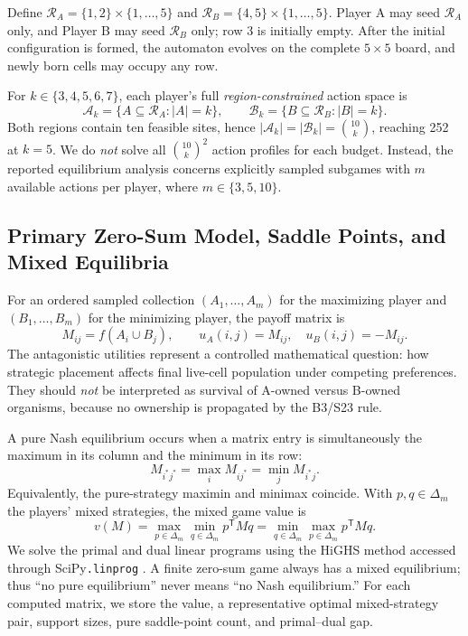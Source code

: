 \documentclass[games,article,submit,moreauthors]{Definitions/mdpi}
\begin{document}
Define $\mathcal{R}_A=\{1,2\}\times\{1,\ldots,5\}$ and $\mathcal{R}_B=\{4,5\}\times\{1,\ldots,5\}$. Player A may seed $\mathcal{R}_A$ only, and Player B may seed  $\mathcal{R}_B$ only; row 3 is initially empty. After the initial configuration is formed, the automaton evolves on the complete $5\times5$ board, and newly born cells may occupy any row.

For $k\in\{3,4,5,6,7\}$, each player's full \emph{region-constrained} action space is
\begin{equation}
\mathcal{A}_k=\{A\subseteq\mathcal{R}_A:|A|=k\},\qquad
\mathcal{B}_k=\{B\subseteq\mathcal{R}_B:|B|=k\}.
\end{equation}
Both regions contain ten feasible sites, hence $|\mathcal{A}_k|=|\mathcal{B}_k|=\binom{10}{k}$, reaching 252 at $k=5$. We do \emph{not} solve all $\binom{10}{k}^2$ action profiles for each budget. Instead, the reported equilibrium analysis concerns explicitly sampled subgames with $m$ available actions per player, where $m\in\{3,5,10\}$.

\subsection{Primary Zero-Sum Model, Saddle Points, and Mixed Equilibria}

For an ordered sampled collection $(A_1,\ldots,A_m)$ for the maximizing player and $(B_1,\ldots,B_m)$ for the minimizing player, the payoff matrix is
\begin{equation}\label{eq:matrix}
M_{ij}=f(A_i\cup B_j),\qquad u_A(i,j)=M_{ij},\quad u_B(i,j)=-M_{ij}.
\end{equation}
The antagonistic utilities represent a controlled mathematical question: how strategic placement affects final live-cell population under competing preferences. They should \emph{not} be interpreted as survival of A-owned versus B-owned organisms, because no ownership is propagated by the B3/S23 rule.

A pure Nash equilibrium occurs when a matrix entry is simultaneously the maximum in its column and the minimum in its row:
\begin{equation}\label{eq:saddle}
M_{i^*j^*}=\max_i M_{ij^*}=\min_j M_{i^*j}.
\end{equation}
Equivalently, the pure-strategy maximin and minimax coincide. With $p,q\in\Delta_m$ the players' mixed strategies, the mixed game value is
\begin{equation}\label{eq:minimax}
v(M)=\max_{p\in\Delta_m}\min_{q\in\Delta_m}p^{\mathsf T}Mq
=\min_{q\in\Delta_m}\max_{p\in\Delta_m}p^{\mathsf T}Mq.
\end{equation}
We solve the primal and dual linear programs using the HiGHS method accessed through SciPy\texttt{.linprog} \citep{vonNeumann1944,nash1951,virtanen2020}. A finite zero-sum game always has a mixed equilibrium; thus ``no pure equilibrium'' never means ``no Nash equilibrium.'' For each computed matrix, we store the value, a representative optimal mixed-strategy pair, support sizes, pure saddle-point count, and primal--dual gap.
\end{document}
